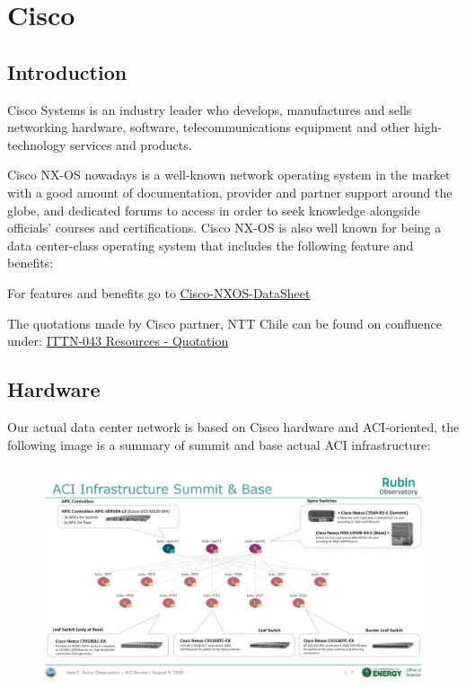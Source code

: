 \section{Cisco}

\subsection{Introduction}

Cisco Systems is an industry leader who develops, manufactures and sells networking hardware, software, telecommunications equipment and other high-technology services and products. 

Cisco NX-OS nowadays is a  well-known network operating system in the market with a good amount of documentation, provider and partner support around the globe, and dedicated forums to access in order to seek knowledge alongside officials’ courses and certifications. Cisco NX-OS is also well known for being a data center-class operating system that includes the following feature and benefits:

For features and benefits go to \href{https://www.cisco.com/c/en/us/products/collateral/ios-nx-os-software/nx-os-software/data_sheet_c78-652063.pdf}{Cisco-NXOS-DataSheet}

The quotations made by Cisco partner, NTT Chile can be found on confluence under: \href{https://confluence.lsstcorp.org/display/IT/ITTN-043+-+Rubin+Network+Re-Engineering}{ITTN-043 Resources - Quotation}

\subsection{Hardware}

Our actual data center network is based on Cisco hardware and ACI-oriented, the following image is a summary of summit and base actual ACI infrastructure:


\begin{figure}
	\includegraphics[scale=0.5]{images/aci-infrastructure-summit-and-base.jpg}
\end{figure}


